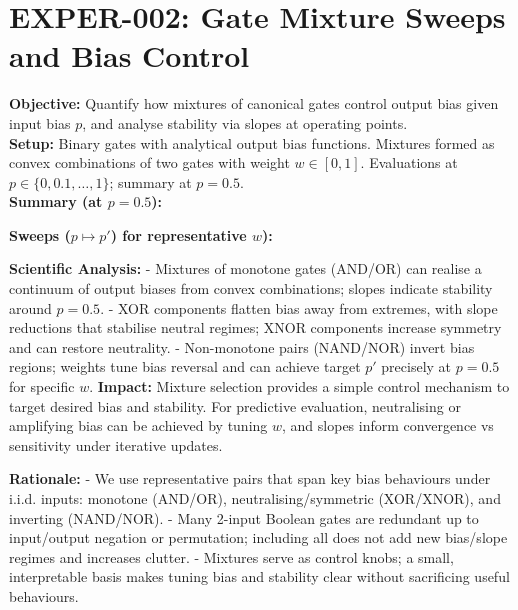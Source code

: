 \documentclass{article}
\begin{document}
\section{EXPER-002: Gate Mixture Sweeps and Bias Control}
\textbf{Objective:} Quantify how mixtures of canonical gates control output bias given input bias $p$, and analyse stability via slopes at operating points.\\
\textbf{Setup:} Binary gates with analytical output bias functions. Mixtures formed as convex combinations of two gates with weight $w\in[0,1]$. Evaluations at $p\in\{0,0.1,\dots,1\}$; summary at $p=0.5$.\\
\textbf{Summary (at $p=0.5$):}\\
\begin{center}
\end{center}
\textbf{Sweeps ($p\mapsto p'$) for representative $w$):}\\
\begin{center}
\end{center}
\begin{center}
\end{center}
\begin{center}
\end{center}
\textbf{Scientific Analysis:}
- Mixtures of monotone gates (AND/OR) can realise a continuum of output biases from convex combinations; slopes indicate stability around $p=0.5$.
- XOR components flatten bias away from extremes, with slope reductions that stabilise neutral regimes; XNOR components increase symmetry and can restore neutrality.
- Non-monotone pairs (NAND/NOR) invert bias regions; weights tune bias reversal and can achieve target $p'$ precisely at $p=0.5$ for specific $w$.
\textbf{Impact:} Mixture selection provides a simple control mechanism to target desired bias and stability. For predictive evaluation, neutralising or amplifying bias can be achieved by tuning $w$, and slopes inform convergence vs sensitivity under iterative updates.

\textbf{Rationale:}
- We use representative pairs that span key bias behaviours under i.i.d. inputs: monotone (AND/OR), neutralising/symmetric (XOR/XNOR), and inverting (NAND/NOR).
- Many 2-input Boolean gates are redundant up to input/output negation or permutation; including all does not add new bias/slope regimes and increases clutter.
- Mixtures serve as control knobs; a small, interpretable basis makes tuning bias and stability clear without sacrificing useful behaviours.
\end{document}
